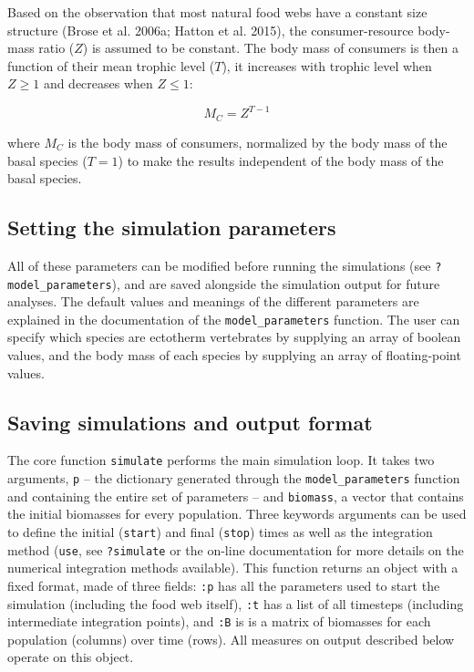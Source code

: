 \documentclass[12pt]{article}
\begin{document}
Based on the observation that most natural food webs have a constant
size structure (Brose et al. 2006a; Hatton et al. 2015), the
consumer-resource body-mass ratio (\(Z\)) is assumed to be constant. The
body mass of consumers is then a function of their mean trophic level
(\(T\)), it increases with trophic level when \(Z\geq 1\) and decreases
when \(Z\leq 1\):

\begin{equation}\label{e:z_ratio}
M_C =  Z^{T-1}
\end{equation}

where \(M_C\) is the body mass of consumers, normalized by the body mass
of the basal species (\(T = 1\)) to make the results independent of the
body mass of the basal species.

\subsection{Setting the simulation
parameters}\label{setting-the-simulation-parameters}

All of these parameters can be modified before running the simulations
(see \texttt{?model\_parameters}), and are saved alongside the
simulation output for future analyses. The default values and meanings
of the different parameters are explained in the documentation of the
\texttt{model\_parameters} function. The user can specify which species
are ectotherm vertebrates by supplying an array of boolean values, and
the body mass of each species by supplying an array of floating-point
values.

\subsection{Saving simulations and output
format}\label{saving-simulations-and-output-format}

The core function \texttt{simulate} performs the main simulation loop.
It takes two arguments, \texttt{p} -- the dictionary generated through
the \texttt{model\_parameters} function and containing the entire set of
parameters -- and \texttt{biomass}, a vector that contains the initial
biomasses for every population. Three keywords arguments can be used to
define the initial (\texttt{start}) and final (\texttt{stop}) times as
well as the integration method (\texttt{use}, see \texttt{?simulate} or
the on-line documentation for more details on the numerical integration
methods available). This function returns an object with a fixed format,
made of three fields: \texttt{:p} has all the parameters used to start
the simulation (including the food web itself), \texttt{:t} has a list
of all timesteps (including intermediate integration points), and
\texttt{:B} is is a matrix of biomasses for each population (columns)
over time (rows). All measures on output described below operate on this
object.
\end{document}
